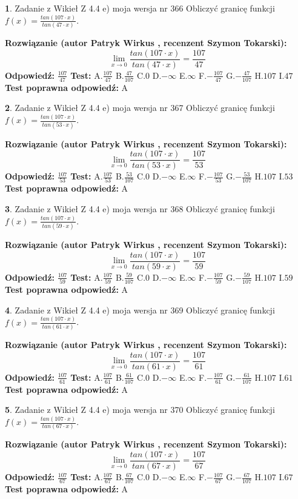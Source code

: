 \documentclass[12pt, a4paper]{article}
\theoremstyle{definition} %
\newtheorem{zad}{}
\newcommand{\zadStart}[1]{\begin{zad}#1\newline}
\newcommand{\zadStop}{\end{zad}}
\newcommand{\rozwStart}[2]{\noindent \textbf{Rozwiązanie (autor #1 , recenzent #2): }\newline}
\newcommand{\rozwStop}{\newline}
\newcommand{\odpStart}{\noindent \textbf{Odpowiedź:}\newline}
\newcommand{\odpStop}{\newline}
\newcommand{\testStart}{\noindent \textbf{Test:}\newline}
\newcommand{\testStop}{\newline}
\newcommand{\kluczStart}{\noindent \textbf{Test poprawna odpowiedź:}\newline}
\newcommand{\kluczStop}{\newline}
\begin{document}
\zadStart{Zadanie z Wikieł Z 4.4 e) moja wersja nr 366}
Obliczyć granicę funkcji $f(x)=\frac{tan(107\cdot x)}{tan(47\cdot x)}$.
\zadStop
\rozwStart{Patryk Wirkus}{Szymon Tokarski}
$$\lim\limits_{x\to 0}\frac{tan(107\cdot x)}{tan(47\cdot x)}=
\frac{107}{47}$$
\rozwStop
\odpStart
$\frac{107}{47}$
\odpStop
\testStart
A.$\frac{107}{47}$
B.$\frac{47}{107}$
C.$0$
D.$-\infty$
E.$\infty$
F.$-\frac{107}{47}$
G.$-\frac{47}{107}$
H.$107$
I.$47$
\testStop
\kluczStart
A
\kluczStop



\zadStart{Zadanie z Wikieł Z 4.4 e) moja wersja nr 367}
Obliczyć granicę funkcji $f(x)=\frac{tan(107\cdot x)}{tan(53\cdot x)}$.
\zadStop
\rozwStart{Patryk Wirkus}{Szymon Tokarski}
$$\lim\limits_{x\to 0}\frac{tan(107\cdot x)}{tan(53\cdot x)}=
\frac{107}{53}$$
\rozwStop
\odpStart
$\frac{107}{53}$
\odpStop
\testStart
A.$\frac{107}{53}$
B.$\frac{53}{107}$
C.$0$
D.$-\infty$
E.$\infty$
F.$-\frac{107}{53}$
G.$-\frac{53}{107}$
H.$107$
I.$53$
\testStop
\kluczStart
A
\kluczStop



\zadStart{Zadanie z Wikieł Z 4.4 e) moja wersja nr 368}
Obliczyć granicę funkcji $f(x)=\frac{tan(107\cdot x)}{tan(59\cdot x)}$.
\zadStop
\rozwStart{Patryk Wirkus}{Szymon Tokarski}
$$\lim\limits_{x\to 0}\frac{tan(107\cdot x)}{tan(59\cdot x)}=
\frac{107}{59}$$
\rozwStop
\odpStart
$\frac{107}{59}$
\odpStop
\testStart
A.$\frac{107}{59}$
B.$\frac{59}{107}$
C.$0$
D.$-\infty$
E.$\infty$
F.$-\frac{107}{59}$
G.$-\frac{59}{107}$
H.$107$
I.$59$
\testStop
\kluczStart
A
\kluczStop



\zadStart{Zadanie z Wikieł Z 4.4 e) moja wersja nr 369}
Obliczyć granicę funkcji $f(x)=\frac{tan(107\cdot x)}{tan(61\cdot x)}$.
\zadStop
\rozwStart{Patryk Wirkus}{Szymon Tokarski}
$$\lim\limits_{x\to 0}\frac{tan(107\cdot x)}{tan(61\cdot x)}=
\frac{107}{61}$$
\rozwStop
\odpStart
$\frac{107}{61}$
\odpStop
\testStart
A.$\frac{107}{61}$
B.$\frac{61}{107}$
C.$0$
D.$-\infty$
E.$\infty$
F.$-\frac{107}{61}$
G.$-\frac{61}{107}$
H.$107$
I.$61$
\testStop
\kluczStart
A
\kluczStop



\zadStart{Zadanie z Wikieł Z 4.4 e) moja wersja nr 370}
Obliczyć granicę funkcji $f(x)=\frac{tan(107\cdot x)}{tan(67\cdot x)}$.
\zadStop
\rozwStart{Patryk Wirkus}{Szymon Tokarski}
$$\lim\limits_{x\to 0}\frac{tan(107\cdot x)}{tan(67\cdot x)}=
\frac{107}{67}$$
\rozwStop
\odpStart
$\frac{107}{67}$
\odpStop
\testStart
A.$\frac{107}{67}$
B.$\frac{67}{107}$
C.$0$
D.$-\infty$
E.$\infty$
F.$-\frac{107}{67}$
G.$-\frac{67}{107}$
H.$107$
I.$67$
\testStop
\kluczStart
A
\kluczStop
\end{document}
